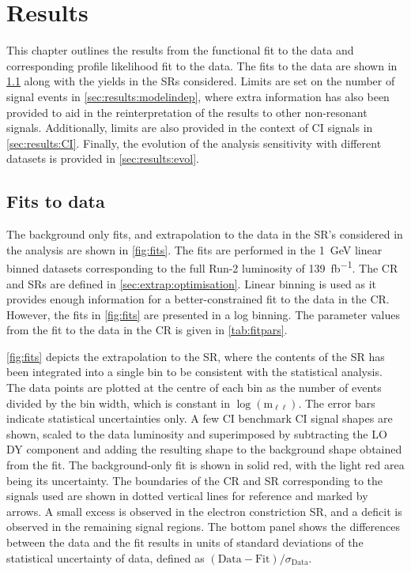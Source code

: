 \chapter{Results}\label{chap:results}
This chapter outlines the results from the functional fit to the data and corresponding profile likelihood fit to the data. The fits to the data are shown in \cref{sec:results:datafit} along with the yields in the SRs considered. Limits are set on the number of signal events in \cref{sec:results:modelindep}, where extra information has also been provided to aid in the reinterpretation of the results to other non-resonant signals. Additionally, limits are also provided in the context of CI signals in \cref{sec:results:CI}. Finally, the evolution of the analysis sensitivity with different datasets is provided in \cref{sec:results:evol}. 

\section{Fits to data}\label{sec:results:datafit}
The background only fits, and extrapolation to the data in the SR's considered in the analysis are shown in \cref{fig:fits}. The fits are performed in the \SI{1}{\giga\electronvolt} linear binned datasets corresponding to the full Run-2 luminosity of \SI{139}{\femto\barn^{-1}}. The CR and SRs are defined in \cref{sec:extrap:optimisation}. Linear binning is used as it provides enough information for a better-constrained fit to the data in the CR. However, the fits in \cref{fig:fits} are presented in a log binning. The parameter values from the fit to the data in the CR is given in \cref{tab:fitpars}. 

\cref{fig:fits} depicts the extrapolation to the SR, where the contents of the SR has been integrated into a single bin to be consistent with the statistical analysis. The data points are plotted at the centre of each bin as the number of events divided by the bin width, which is constant in $\log{(\text{m}_{\ell\ell})}$. The error bars indicate statistical uncertainties only. A few CI benchmark CI signal shapes are shown, scaled to the data luminosity and superimposed by subtracting the LO DY component and adding the resulting shape to the background shape obtained from the fit. The background-only fit is shown in solid red, with the light red area being its uncertainty. The boundaries of the CR and SR corresponding to the signals used are shown in dotted vertical lines for reference and marked by arrows. A small excess is observed in the electron constriction SR, and a deficit is observed in the remaining signal regions. The bottom panel shows the differences between the data and the fit results in units of standard deviations of the statistical uncertainty of data, defined as $(\mathrm{Data}-\mathrm{Fit})/\sigma_\mathrm{Data}$. 

